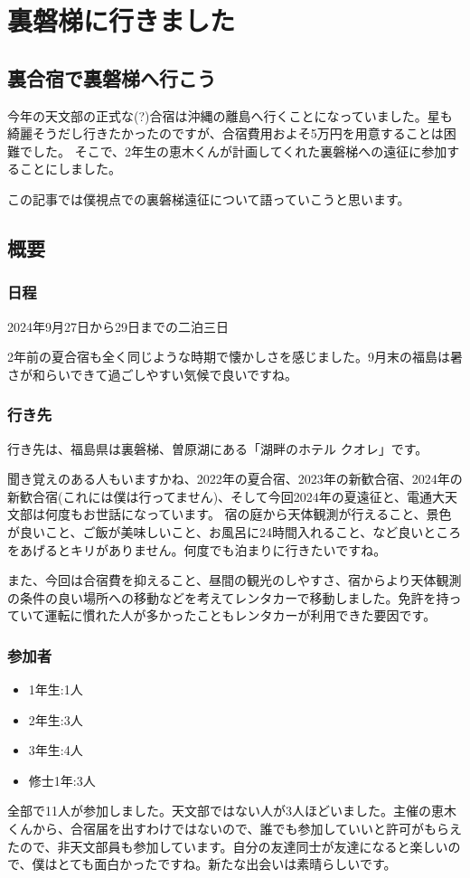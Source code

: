 \documentclass[../main]{subfiles}
\begin{document}
\chapter{裏磐梯に行きました} %

\noindent

\section{裏合宿で裏磐梯へ行こう}
今年の天文部の正式な(?)合宿は沖縄の離島へ行くことになっていました。星も綺麗そうだし行きたかったのですが、合宿費用およそ5万円を用意することは困難でした。
そこで、2年生の恵木くんが計画してくれた裏磐梯への遠征に参加することにしました。

この記事では僕視点での裏磐梯遠征について語っていこうと思います。

\section{概要}
\subsection{日程}
2024年9月27日から29日までの二泊三日

2年前の夏合宿も全く同じような時期で懐かしさを感じました。9月末の福島は暑さが和らいできて過ごしやすい気候で良いですね。
\subsection{行き先}
行き先は、福島県は裏磐梯、曽原湖にある「湖畔のホテル クオレ」です。


聞き覚えのある人もいますかね、2022年の夏合宿、2023年の新歓合宿、2024年の新歓合宿(これには僕は行ってません)、そして今回2024年の夏遠征と、電通大天文部は何度もお世話になっています。
宿の庭から天体観測が行えること、景色が良いこと、ご飯が美味しいこと、お風呂に24時間入れること、など良いところをあげるとキリがありません。何度でも泊まりに行きたいですね。

また、今回は合宿費を抑えること、昼間の観光のしやすさ、宿からより天体観測の条件の良い場所への移動などを考えてレンタカーで移動しました。免許を持っていて運転に慣れた人が多かったこともレンタカーが利用できた要因です。


\subsection{参加者}
\begin{itemize}
\item 1年生:1人
\item 2年生:3人
\item 3年生:4人
\item 修士1年:3人
\end{itemize}
全部で11人が参加しました。天文部ではない人が3人ほどいました。主催の恵木くんから、合宿届を出すわけではないので、誰でも参加していいと許可がもらえたので、非天文部員も参加しています。自分の友達同士が友達になると楽しいので、僕はとても面白かったですね。新たな出会いは素晴らしいです。
\end{document}
